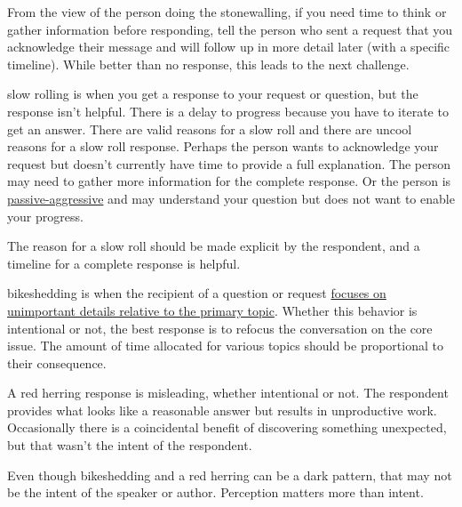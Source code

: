 From the view of the person doing the stonewalling, if you need time to think or gather information before responding, 
tell the person who sent a request that you acknowledge their message and will follow up in more detail later (with a specific timeline). While better than no response, this leads to the next challenge.

\Gls{slow rolling}
is when you get a response to your request or question, but the response isn't helpful. There is a delay to progress because you have to iterate to get an answer. There are valid reasons for a slow roll and there are uncool reasons for a slow roll response. Perhaps the person wants to acknowledge your request but doesn't currently have time to provide a full explanation. The person may need to gather more information for the complete response. Or the person is \href{https://en.wikipedia.org/wiki/Passive-aggressive_behavior}{passive-aggressive}
and may understand your question but does not want to enable your progress. 

The reason for a slow roll should be made explicit by the respondent, 
and a timeline for a complete response is helpful. 


\Gls{bikeshedding} 
is when the recipient of a question or request \href{https://en.wikipedia.org/wiki/Law_of_triviality}{focuses on unimportant details relative to the primary topic}. 
Whether this behavior is intentional or not, the best response is to refocus the conversation on the core issue. The amount of time allocated for various topics should be proportional to their consequence. 

A \gls{red herring}
response is misleading, whether intentional or not. The respondent provides what looks like a reasonable answer but results in unproductive work. Occasionally there is a coincidental benefit of discovering something unexpected, but that wasn't the intent of the respondent. 


Even though bikeshedding and a red herring can be a dark pattern, that may not be the intent of the speaker or author. Perception matters more than intent.
